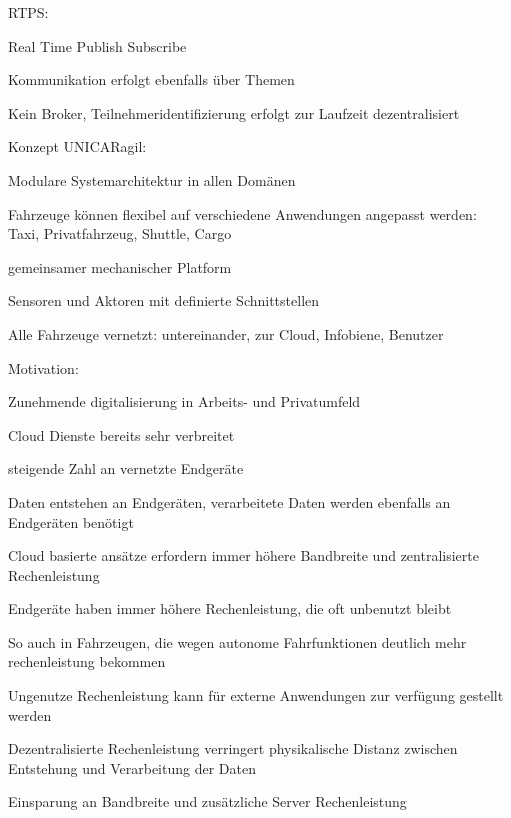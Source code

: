 \begin{notes}
\begin{notes}
\begin{notes}
                \item RTPS:
                \begin{notes}
                    \item Real Time Publish Subscribe
                    \item Kommunikation erfolgt ebenfalls über Themen
                    \item Kein Broker, Teilnehmeridentifizierung erfolgt zur Laufzeit dezentralisiert
                \end{notes}
            \end{notes}
    \end{notes}
    \item Konzept UNICARagil:
        \begin{notes}
            \item Modulare Systemarchitektur in allen Domänen 
            \item Fahrzeuge können flexibel auf verschiedene Anwendungen angepasst werden: Taxi, Privatfahrzeug, Shuttle, Cargo
            \item gemeinsamer mechanischer Platform
            \item Sensoren und Aktoren mit definierte Schnittstellen
            \item Alle Fahrzeuge vernetzt: untereinander, zur Cloud, Infobiene, Benutzer 
        \end{notes}
    \item Motivation:
    \begin{notes}
        \item Zunehmende digitalisierung in Arbeits- und Privatumfeld
        \item Cloud Dienste bereits sehr verbreitet
        \item steigende Zahl an vernetzte Endgeräte
        \item Daten entstehen an Endgeräten, verarbeitete Daten werden ebenfalls an Endgeräten benötigt
        \item Cloud basierte ansätze erfordern immer höhere Bandbreite und zentralisierte Rechenleistung
        \item Endgeräte haben immer höhere Rechenleistung, die oft unbenutzt bleibt
        \item So auch in Fahrzeugen, die wegen autonome Fahrfunktionen deutlich mehr rechenleistung bekommen
        \item Ungenutze Rechenleistung kann für externe Anwendungen zur verfügung gestellt werden
        \item Dezentralisierte Rechenleistung verringert physikalische Distanz zwischen Entstehung und Verarbeitung der Daten
        \item Einsparung an Bandbreite und zusätzliche Server Rechenleistung
    \end{notes}
\end{notes} 